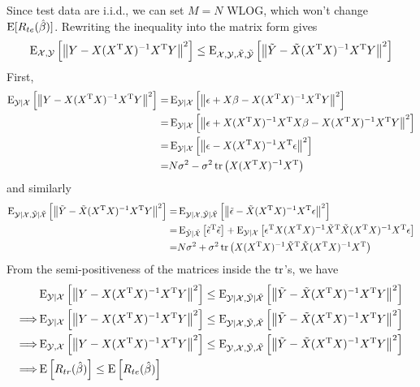 \begin{sol}
Since test data are i.i.d., we can set $M=N$ WLOG, which won't change $\operatorname{E}[R_{te}(\hat{\beta})]$. Rewriting the inequality into the matrix form gives
\[
\operatorname{E}_{\mathcal{X},\mathcal{Y}}\left[\left\|Y-X(X^{\mathrm{T}}X)^{-1}X^{\mathrm{T}}Y\right\|^2\right] \le \operatorname{E}_{\mathcal{X},\mathcal{Y},\tilde{\mathcal{X}},\tilde{\mathcal{Y}}}\left[\left\|\tilde{Y}-\tilde{X}(X^{\mathrm{T}}X)^{-1}X^{\mathrm{T}}Y\right\|^2\right]
\]
First,
\begin{align*}
\operatorname{E}_{\mathcal{Y}\vert \mathcal{X}}\left[\left\|Y-X(X^{\mathrm{T}}X)^{-1}X^{\mathrm{T}}Y\right\|^2\right] =& \operatorname{E}_{\mathcal{Y}\vert \mathcal{X}}\left[\left\|\epsilon+X\beta-X(X^{\mathrm{T}}X)^{-1}X^{\mathrm{T}}Y\right\|^2\right] \\
=& \operatorname{E}_{\mathcal{Y}\vert \mathcal{X}}\left[\left\|\epsilon+X(X^{\mathrm{T}}X)^{-1}X^{\mathrm{T}}X\beta-X(X^{\mathrm{T}}X)^{-1}X^{\mathrm{T}}Y\right\|^2\right]\\
=& \operatorname{E}_{\mathcal{Y}\vert \mathcal{X}}\left[\left\|\epsilon-X(X^{\mathrm{T}}X)^{-1}X^{\mathrm{T}}\epsilon\right\|^2\right] \\
=& N\sigma^2-\sigma^2\operatorname{tr}\left(X(X^{\mathrm{T}}X)^{-1}X^{\mathrm{T}}\right)
\end{align*}
and similarly
\begin{align*}
\operatorname{E}_{\mathcal{Y}\vert \mathcal{X},\tilde{\mathcal{Y}}\vert \tilde{\mathcal{X}}}\left[\left\|\tilde{Y}-\tilde{X}(X^{\mathrm{T}}X)^{-1}X^{\mathrm{T}}Y\right\|^2\right] =& \operatorname{E}_{\mathcal{Y}\vert \mathcal{X},\tilde{\mathcal{Y}}\vert \tilde{\mathcal{X}}}\left[\left\|\tilde{\epsilon}-\tilde{X}(X^{\mathrm{T}}X)^{-1}X^{\mathrm{T}}\epsilon\right\|^2\right] \\
=& \operatorname{E}_{\tilde{\mathcal{Y}}\vert \tilde{\mathcal{X}}}\left[\tilde{\epsilon}^{\mathrm{T}}\tilde{\epsilon}\right] + \operatorname{E}_{\mathcal{Y}\vert \mathcal{X}}\left[\epsilon^{\mathrm{T}}X(X^{\mathrm{T}}X)^{-1}\tilde{X}^{\mathrm{T}}\tilde{X}(X^{\mathrm{T}}X)^{-1}X^{\mathrm{T}}\epsilon\right] \\
=& N\sigma^2+\sigma^2\operatorname{tr}\left(X(X^{\mathrm{T}}X)^{-1}\tilde{X}^{\mathrm{T}}\tilde{X}(X^{\mathrm{T}}X)^{-1}X^{\mathrm{T}}\right)
\end{align*}
From the semi-positiveness of the matrices inside the $\operatorname{tr}$'s, we have
\begin{align*}
& \operatorname{E}_{\mathcal{Y}\vert \mathcal{X}}\left[\left\|Y-X(X^{\mathrm{T}}X)^{-1}X^{\mathrm{T}}Y\right\|^2\right]
\le
\operatorname{E}_{\mathcal{Y}\vert \mathcal{X},\tilde{\mathcal{Y}}\vert \tilde{\mathcal{X}}}\left[\left\|\tilde{Y}-\tilde{X}(X^{\mathrm{T}}X)^{-1}X^{\mathrm{T}}Y\right\|^2\right]\\
\Longrightarrow& 
\operatorname{E}_{\mathcal{Y}\vert \mathcal{X}}\left[\left\|Y-X(X^{\mathrm{T}}X)^{-1}X^{\mathrm{T}}Y\right\|^2\right]
\le
\operatorname{E}_{\mathcal{Y}\vert \mathcal{X},\tilde{\mathcal{Y}}, \tilde{\mathcal{X}}}\left[\left\|\tilde{Y}-\tilde{X}(X^{\mathrm{T}}X)^{-1}X^{\mathrm{T}}Y\right\|^2\right] \\
\Longrightarrow& 
\operatorname{E}_{\mathcal{Y}, \mathcal{X}}\left[\left\|Y-X(X^{\mathrm{T}}X)^{-1}X^{\mathrm{T}}Y\right\|^2\right]
\le
\operatorname{E}_{\mathcal{Y}, \mathcal{X},\tilde{\mathcal{Y}}, \tilde{\mathcal{X}}}\left[\left\|\tilde{Y}-\tilde{X}(X^{\mathrm{T}}X)^{-1}X^{\mathrm{T}}Y\right\|^2\right] \\
\Longrightarrow& \operatorname{E}\left[R_{tr}(\hat{\beta})\right] \le \operatorname{E}\left[R_{te}(\hat{\beta})\right]
\end{align*}
\end{sol}
